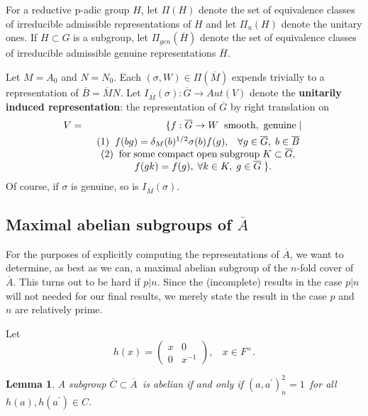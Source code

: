 \documentclass[twocolumn,10pt]{article}
\newtheorem{lemma}[theorem]{Lemma}
\begin{document}
For a reductive p-adic group $H$, let
$\Pi (H)$ denote the set of equivalence classes of irreducible
admissible representations of $H$ and let
$\Pi_u(H)$ denote the unitary ones. If $H\subset G$
is a subgroup, let $\Pi_{gen}(\overline{H})$
denote the set of equivalence classes of irreducible
admissible genuine representations $\overline{H}$.

Let $M=A_0$ and $N=N_0$. Each $(\sigma ,W)\in \Pi (\overline{M})$
expends trivially to a representation of
$\overline{B}=\overline{M}N$. Let
$I_{\overline{M}}(\sigma ):\overline{G}\rightarrow Aut(V)$ denote
the {\bf unitarily induced representation}: the representation of
$\overline{G}$ by right translation on 
\begin{eqnarray*}
V &=&\{f:\overline{G}\rightarrow W\;\;{\rm smooth,\ genuine}\;|\; \\
&& 
\begin{array}{c}
(1)\;\;f(bg)=\delta _M(b)^{1/2}\sigma (b)f(g),\;\; 
\;\forall g\in \overline{G},\;b\in \overline{B} \\ 
(2)\;\;{\rm for\;some\; compact\;open\;subgroup}\;K\subset 
\overline{G},\\
\ \ \ f(gk)=f(g),\; \forall k\in K,\;g\in \overline{G}\; \}.
\end{array}
\end{eqnarray*}
Of course, if $\sigma$ is genuine, so is
$I_{\overline{M}}(\sigma )$.


\subsection{Maximal abelian subgroups of $\overline{A}$}

\label{subsec:4.1}
For the purposes of explicitly computing the representations
of $\overline{A}$, we want to determine, as best as we
can, a maximal abelian subgroup of the $n$-fold cover of
$\overline{A}$. This turns out to be hard if $p|n$.
Since the (incomplete) results in the
case $p|n$ will not needed for our final results,
we merely state the result in the case $p$ and
$n$ are relatively prime.

Let
\[
h(x)=\left(
\begin{array}{cc}
x & 0\\
0 & x^{-1}
\end{array}
\right),\ \ \ \ 
x\in F^\times .
\]

\begin{lemma}
A subgroup $\overline{C}\subset \overline{A}$\ is abelian 
if and only
if $(a,a^{\prime })_n^2=1$\ for all $h(a),h(a^{\prime })\in C$.
\end{lemma}
\end{document}
